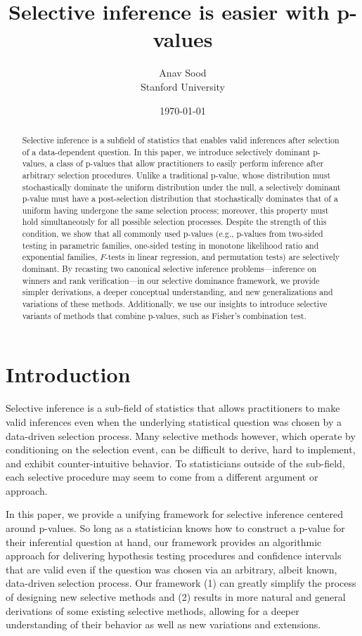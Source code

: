 \documentclass{article}
\title{Selective inference is easier with p-values}
\author{Anav Sood\\ Stanford University}
\date{\today}
\begin{document}
\maketitle

\begin{abstract}
Selective inference is a subfield of statistics that enables valid inferences after selection of a data-dependent question. In this paper, we introduce selectively dominant p-values, a class of p-values that allow practitioners to easily perform inference after arbitrary selection procedures. Unlike a traditional p-value, whose distribution must stochastically dominate the uniform distribution under the null, a selectively dominant p-value must have a  post-selection distribution that stochastically dominates that of a uniform having undergone the same selection process; moreover, this property must hold simultaneously for all possible selection processes. Despite the strength of this condition, we show that all commonly used p-values (e.g., p-values from two-sided testing in parametric families, one-sided testing in monotone likelihood ratio and exponential families, $F$-tests in linear regression, and permutation tests) are selectively dominant. By recasting two canonical selective inference problems—inference on winners and rank verification—in our selective dominance framework, we provide simpler derivations, a deeper conceptual understanding, and new generalizations and variations of these methods. Additionally, we use our insights to introduce selective variants of methods that combine p-values, such as Fisher's combination test. 
\end{abstract}


\section{Introduction}

Selective inference is a sub-field of statistics that allows practitioners to make valid inferences even when  the underlying statistical question was chosen by a data-driven selection process. Many selective methods however, which operate by conditioning on the selection event, can be difficult to derive, hard to implement, and exhibit counter-intuitive behavior. To statisticians outside of the sub-field, each selective procedure may seem to come from a different argument or approach.

In this paper, we provide a unifying framework for selective inference centered around p-values. So long as a statistician knows how to construct a p-value for their inferential question at hand, our framework provides an algorithmic approach for delivering hypothesis testing procedures and confidence intervals that are valid even if the question was chosen via an arbitrary, albeit known, data-driven selection process. Our framework (1) can greatly simplify the process of designing new selective methods and (2) results in more natural and general derivations of some existing selective methods, allowing for a deeper understanding of their behavior as well as new variations and extensions. 
\end{document}

